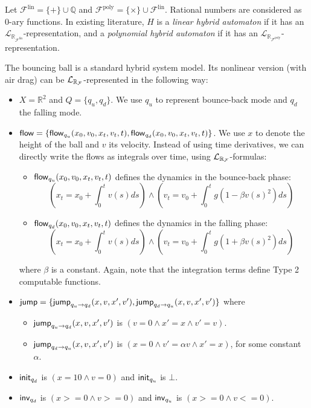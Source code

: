 \documentclass[10pt,envcountsect]{llncs}
\begin{document}
\begin{example} Let $\mathcal{F}^{\mathrm{lin}} = \{+\}\cup \mathbb{Q}$ and $\mathcal{F}^{\mathrm{poly}}=\{\times\}\cup\mathcal{F}^{\mathrm{lin}}$. Rational numbers are considered as 0-ary functions. In existing literature, $H$ is a {\em linear hybrid automaton} if it has an $\mathcal{L}_{\mathbb{R}_{\mathcal{F}^{\mathrm{lin}}}}$-representation, and a {\em polynomial hybrid automaton} if it has an $\mathcal{L}_{\mathbb{R}_{\mathcal{F}^{\mathrm{poly}}}}$-representation.
\end{example}

\begin{example}
The bouncing ball is a standard hybrid system model. Its nonlinear version (with air drag) can be $\mathcal{L}_{\mathbb{R}_{\mathcal{F}}}$-represented in the following way:
\begin{itemize}
\item $X = \mathbb{R}^2$ and $Q = \{q_u, q_d\}$. We use $q_u$ to represent bounce-back mode and $q_d$ the falling mode.
\item $\mathsf{flow} = \{\mathsf{flow}_{q_u}(x_0, v_0, x_t, v_t, t), \mathsf{flow}_{q_d}(x_0, v_0, x_t, v_t, t)\}$. We use $x$ to denote the height of the ball and $v$ its velocity. Instead of using time derivatives, we can directly write the flows as integrals over time, using $\mathcal{L}_{\mathbb{R}_{\mathcal{F}}}$-formulas:
\begin{itemize}
\item $\mathsf{flow}_{q_u}(x_0, v_0, x_t, v_t, t)$ defines the dynamics in the bounce-back phase:
$$(x_t = x_0 + \int_0^{t} v(s) ds) \wedge (v_t = v_0 + \int_0^t g(1-\beta v(s)^2) ds)$$
\item $\mathsf{flow}_{q_d}(x_0, v_0, x_t, v_t, t)$ defines the dynamics in the falling phase:
$$(x_t = x_0 + \int_0^{t} v(s) ds) \wedge (v_t = v_0 + \int_0^t g(1+\beta v(s)^2) ds)$$
\end{itemize}where
$\beta$ is a constant. Again, note that the integration terms define Type 2 computable functions.
\item $\mathsf{jump} = \{\mathsf{jump}_{q_u \rightarrow q_d} (x, v, x', v'), \mathsf{jump}_{q_d \rightarrow q_u} (x, v, x', v')\}$ where
\begin{itemize}
 \item $\mathsf{jump}_{q_u \rightarrow q_d} (x, v, x', v')$ is $(v= 0 \wedge x' = x \wedge v' = v)$.
\item $\mathsf{jump}_{q_d \rightarrow q_u} (x, v, x', v')$ is $(x= 0 \wedge v' = \alpha v\wedge x'=x)$,  for some constant $\alpha$.
\end{itemize}
\vspace{0.1cm}
\item $\mathsf{init}_{q_d}$ is $(x=10 \wedge v=0)$ and $\mathsf{init}_{q_u}$ is $\bot$.
\item $\mathsf{inv}_{q_d}$ is $(x>=0 \wedge v>=0)$ and $\mathsf{inv}_{q_u}$ is $(x>=0 \wedge v<=0)$.
\end{itemize}
\end{example}
\end{document}
